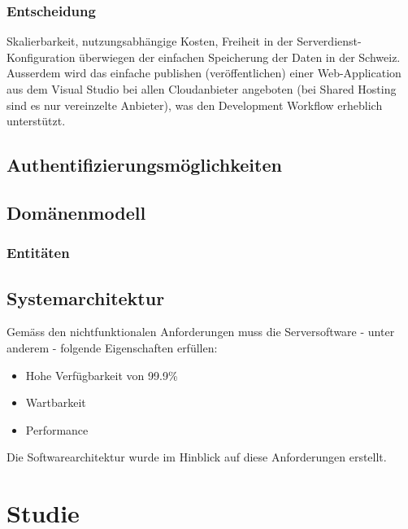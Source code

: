 \subsection{Entscheidung}\label{entscheidung-2}

Skalierbarkeit, nutzungsabhängige Kosten, Freiheit in der
Serverdienst-Konfiguration überwiegen der einfachen Speicherung der
Daten in der Schweiz. Ausserdem wird das einfache publishen
(veröffentlichen) einer Web-Application aus dem Visual Studio bei allen
Cloudanbieter angeboten (bei Shared Hosting sind es nur vereinzelte
Anbieter), was den Development Workflow erheblich unterstützt.

\section{Authentifizierungsmöglichkeiten}\label{authentifizierungsmuxf6glichkeiten}

\section{Domänenmodell}\label{domuxe4nenmodell}

\subsection{Entitäten}\label{entituxe4ten}

\section{Systemarchitektur}\label{systemarchitektur}

Gemäss den nichtfunktionalen Anforderungen muss die Serversoftware -
unter anderem - folgende Eigenschaften erfüllen:

\begin{itemize}
\tightlist
\item
  Hohe Verfügbarkeit von 99.9\%
\item
  Wartbarkeit
\item
  Performance
\end{itemize}

Die Softwarearchitektur wurde im Hinblick auf diese Anforderungen
erstellt.

\newpage

\chapter{Studie}\label{studie}

